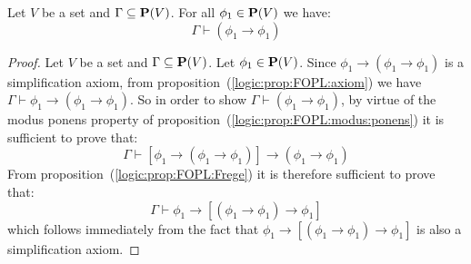 \begin{prop}\label{logic:prop:FOPL:PimP}
Let $V$ be a set and $\Gamma\subseteq\mbox{${\bf P}(V)$}$. For all $\phi_{1}\in\mbox{${\bf P}(V)$}$
we have:
    \[
    \Gamma\vdash(\phi_{1}\to\phi_{1})
    \]
\end{prop}
\begin{proof}
Let $V$ be a set and $\Gamma\subseteq\mbox{${\bf P}(V)$}$. Let $\phi_{1}\in\mbox{${\bf P}(V)$}$.
Since $\phi_{1}\to(\phi_{1}\to\phi_{1})$ is a simplification axiom,
from proposition~(\ref{logic:prop:FOPL:axiom}) we have
$\Gamma\vdash\phi_{1}\to(\phi_{1}\to\phi_{1})$. So in order to show
$\Gamma\vdash(\phi_{1}\to\phi_{1})$, by virtue of the modus ponens
property of proposition~(\ref{logic:prop:FOPL:modus:ponens}) it is
sufficient to prove that:
    \[
    \Gamma\vdash[\phi_{1}\to(\phi_{1}\to\phi_{1})]\to(\phi_{1}\to\phi_{1})
    \]
From proposition~(\ref{logic:prop:FOPL:Frege}) it is therefore
sufficient to prove that:
    \[
    \Gamma\vdash\phi_{1}\to[(\phi_{1}\to\phi_{1})\to\phi_{1}]
    \]
which follows immediately from the fact that
$\phi_{1}\to[(\phi_{1}\to\phi_{1})\to\phi_{1}]$ is also a
simplification axiom.
\end{proof}
